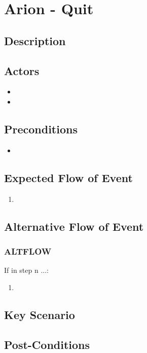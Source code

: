 \documentclass{scrreprt}
\begin{document}
\chapter*{Arion - Quit}

\section*{Description}

\section*{Actors}
\begin{itemize}
    \item 
    \item 
\end{itemize}

\section*{Preconditions}
\begin{itemize}
    \item 
\end{itemize}

\section*{Expected Flow of Event}
\begin{enumerate}[1.]
    \item 
\end{enumerate}

\section*{Alternative Flow of Event}
\subsection*{ALTFLOW}
If in step n ...:
\begin{enumerate}
    \item 
\end{enumerate}

\section*{Key Scenario}

\section*{Post-Conditions}
\end{document}
